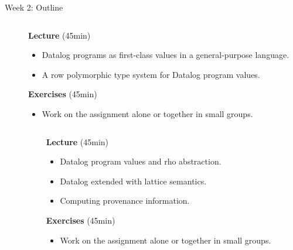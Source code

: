 \begin{frame}{Week 2: Outline}
\color{gray}
\begin{columns}
\begin{column}{.05\textwidth}
\end{column}
\begin{column}{.95\textwidth}
    \footnotesize
\textbf{Lecture} (45min)  \vspace{-2mm}
\begin{itemize}
    \color{gray}
    \setlength\itemsep{-0.5em}
    \item Datalog programs as first-class values in a general-purpose language.
    \item A row polymorphic type system for Datalog program values.
\end{itemize}
\textbf{Exercises} (45min) \vspace{-2mm}
\begin{itemize}
    \color{gray}
    \item Work on the assignment alone or together in small groups.
\end{itemize}
\end{column}
\end{columns}

\medskip
\medskip
\medskip

\color{black}
\begin{columns}
\begin{column}{.05\textwidth}
\end{column}
\begin{column}{.95\textwidth}
\footnotesize
\textbf{Lecture} (45min) \vspace{-2mm}
\begin{itemize}
    \setlength\itemsep{-0.5em}
    \item Datalog program values and rho abstraction.
    \item Datalog extended with lattice semantics.
    \item Computing provenance information.
\end{itemize}
\textbf{Exercises} (45min)  \vspace{-2mm}
\begin{itemize}
    \item Work on the assignment alone or together in small groups.
\end{itemize}
\end{column}
\end{columns}
\end{frame}

